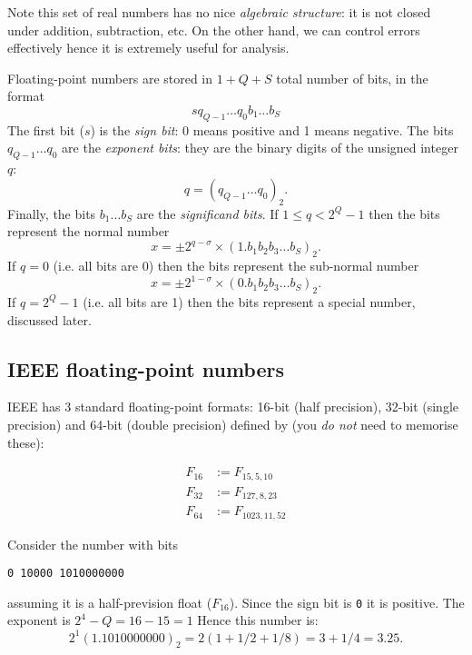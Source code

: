 Note this set of real numbers has no nice \emph{algebraic structure}: it is not closed under addition, subtraction, etc. On the other hand, we can control errors effectively hence it is extremely useful for analysis.

Floating-point numbers are stored in $1 + Q + S$ total number of bits, in the format
\[
sq_{Q-1}\ensuremath{\ldots}q_0 b_1 \ensuremath{\ldots}b_S
\]
The first bit ($s$) is the \emph{sign bit}: 0 means positive and 1 means negative. The bits $q_{Q-1}\ensuremath{\ldots}q_0$ are the \emph{exponent bits}: they are the binary digits of the unsigned integer $q$: 
\[
q = (q_{Q-1}\ensuremath{\ldots}q_0)_2.
\]
Finally, the bits $b_1\ensuremath{\ldots}b_S$ are the \emph{significand bits}. If $1 \ensuremath{\leq} q < 2^Q-1$ then the bits represent the normal number
\[
x = \ensuremath{\pm} 2^{q-\ensuremath{\sigma}} \ensuremath{\times} (1.b_1b_2b_3\ensuremath{\ldots}b_S)_2.
\]
If $q = 0$ (i.e. all bits are 0) then the bits represent the sub-normal number
\[
x = \ensuremath{\pm} 2^{1-\ensuremath{\sigma}} \ensuremath{\times} (0.b_1b_2b_3\ensuremath{\ldots}b_S)_2.
\]
If $q = 2^Q-1$  (i.e. all bits are 1) then the bits represent a special number, discussed later.

\subsection{IEEE floating-point numbers}
\begin{definition}  IEEE has 3 standard floating-point formats: 16-bit (half precision), 32-bit (single precision) and 64-bit (double precision) defined by (you \emph{do not} need to memorise these):


\begin{align*}
F_{16} &:= F_{15,5,10} \\
F_{32} &:= F_{127,8,23} \\
F_{64} &:= F_{1023,11,52}
\end{align*}
\end{definition}

\begin{example} Consider the number with bits

\begin{verbatim}
0 10000 1010000000
\end{verbatim}
assuming it is a half-prevision float ($F_{16}$).  Since the sign bit is \texttt{0} it is positive. The exponent is $2^4 - Q = 16 - 15 = 1$ Hence this number is:
\[
2^1 (1.1010000000)_2 = 2 (1 + 1/2 + 1/8) = 3+1/4 = 3.25.
\]
\end{example}

